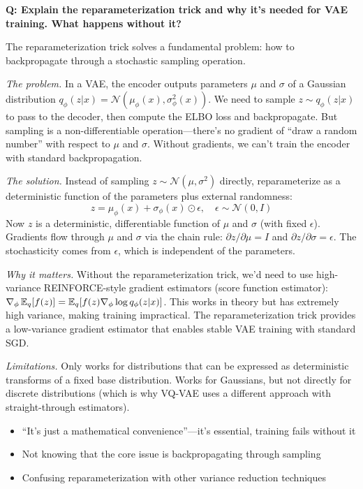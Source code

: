 \begin{interviewq}
\textbf{Q: Explain the reparameterization trick and why it's needed for VAE training. What happens without it?}

 \quad {} \quad \badgefreq{\freqhigh}

\stronganswer The reparameterization trick solves a fundamental problem: how to backpropagate through a stochastic sampling operation.

\textit{The problem.} In a VAE, the encoder outputs parameters $\mu$ and $\sigma$ of a Gaussian distribution $q_\phi(z|x) = \mathcal{N}(\mu_\phi(x), \sigma_\phi^2(x))$. We need to sample $z \sim q_\phi(z|x)$ to pass to the decoder, then compute the ELBO loss and backpropagate. But sampling is a non-differentiable operation---there's no gradient of ``draw a random number'' with respect to $\mu$ and $\sigma$. Without gradients, we can't train the encoder with standard backpropagation.

\textit{The solution.} Instead of sampling $z \sim \mathcal{N}(\mu, \sigma^2)$ directly, reparameterize as a deterministic function of the parameters plus external randomness:
$$z = \mu_\phi(x) + \sigma_\phi(x) \odot \epsilon, \quad \epsilon \sim \mathcal{N}(0, I)$$
Now $z$ is a deterministic, differentiable function of $\mu$ and $\sigma$ (with fixed $\epsilon$). Gradients flow through $\mu$ and $\sigma$ via the chain rule: $\partial z / \partial \mu = I$ and $\partial z / \partial \sigma = \epsilon$. The stochasticity comes from $\epsilon$, which is independent of the parameters.

\textit{Why it matters.} Without the reparameterization trick, we'd need to use high-variance REINFORCE-style gradient estimators (score function estimator): $\nabla_\phi \operatorname{\mathbb{E}}_q[f(z)] = \operatorname{\mathbb{E}}_q[f(z) \nabla_\phi \log q_\phi(z|x)]$. This works in theory but has extremely high variance, making training impractical. The reparameterization trick provides a low-variance gradient estimator that enables stable VAE training with standard SGD.

\textit{Limitations.} Only works for distributions that can be expressed as deterministic transforms of a fixed base distribution. Works for Gaussians, but not directly for discrete distributions (which is why VQ-VAE uses a different approach with straight-through estimators).

\redflags
\begin{itemize}
    \item ``It's just a mathematical convenience''---it's essential, training fails without it
    \item Not knowing that the core issue is backpropagating through sampling
    \item Confusing reparameterization with other variance reduction techniques
\end{itemize}


\end{interviewq}
